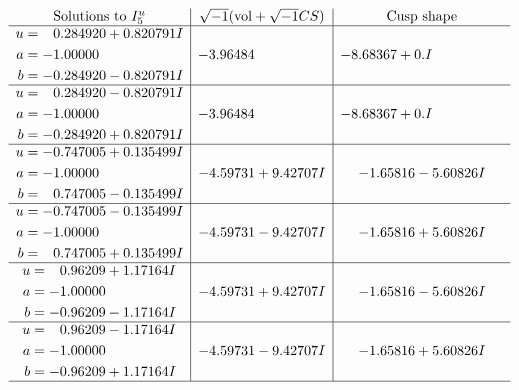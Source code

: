 \documentclass[1p]{elsarticle_modified}
\theoremstyle{definition}
\newcommand{\I}{\sqrt{-1}}
\begin{document}
$$\begin{array}{c|c|c}  
\text{Solutions to }I^u_{5}& \I (\text{vol} + \sqrt{-1}CS) & \text{Cusp shape}\\
 \hline 
\begin{aligned}
u &= \phantom{-}0.284920 + 0.820791 I \\
a &= -1.00000\phantom{ +0.000000I} \\
b &= -0.284920 - 0.820791 I\end{aligned}
 & -3.96484\phantom{ +0.000000I} & -8.68367 + 0. I\phantom{ +0.000000I} \\ \hline\begin{aligned}
u &= \phantom{-}0.284920 - 0.820791 I \\
a &= -1.00000\phantom{ +0.000000I} \\
b &= -0.284920 + 0.820791 I\end{aligned}
 & -3.96484\phantom{ +0.000000I} & -8.68367 + 0. I\phantom{ +0.000000I} \\ \hline\begin{aligned}
u &= -0.747005 + 0.135499 I \\
a &= -1.00000\phantom{ +0.000000I} \\
b &= \phantom{-}0.747005 - 0.135499 I\end{aligned}
 & -4.59731 + 9.42707 I & -1.65816 - 5.60826 I \\ \hline\begin{aligned}
u &= -0.747005 - 0.135499 I \\
a &= -1.00000\phantom{ +0.000000I} \\
b &= \phantom{-}0.747005 + 0.135499 I\end{aligned}
 & -4.59731 - 9.42707 I & -1.65816 + 5.60826 I \\ \hline\begin{aligned}
u &= \phantom{-}0.96209 + 1.17164 I \\
a &= -1.00000\phantom{ +0.000000I} \\
b &= -0.96209 - 1.17164 I\end{aligned}
 & -4.59731 + 9.42707 I & -1.65816 - 5.60826 I \\ \hline\begin{aligned}
u &= \phantom{-}0.96209 - 1.17164 I \\
a &= -1.00000\phantom{ +0.000000I} \\
b &= -0.96209 + 1.17164 I\end{aligned}
 & -4.59731 - 9.42707 I & -1.65816 + 5.60826 I\\
 \hline 
 \end{array}$$\newpage\newpage\renewcommand{\arraystretch}{1}
\end{document}
